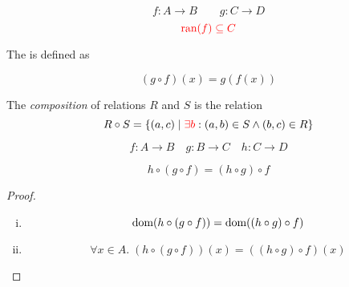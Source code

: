 
\begin{frame}{}
  \begin{center}
  \end{center}

\end{frame}

\begin{frame}{}
  \begin{definition}[Composition]
    \[
      f: A \to B \qquad g: C \to D
    \]
    \[
      \textcolor{red}{\text{ran}(f) \subseteq C}
    \]

    The   is defined as

    \[
      (g \circ f) (x) = g(f(x))
    \]
  \end{definition}

  \begin{center}
  \end{center}

  \pause
  \vspace{-0.30cm}
  \begin{definition}[Composition]
    The {\it composition} of relations $R$ and $S$ is the relation
    \[
      R \circ S = \{(a, c) \mid \textcolor{red}{\exists b}: (a, b) \in S \land (b, c) \in R\}
    \]
  \end{definition}
\end{frame}

\begin{frame}{}
  \begin{theorem}
    \[
      f: A \to B \quad g: B \to C \quad h: C \to D
    \]

    \[
      h \circ (g \circ f) = (h \circ g) \circ f
    \]
  \end{theorem}

  \pause
  \vspace{0.60cm}
  \begin{proof}
    \pause
    \begin{enumerate}[(i)]
      \item
        \[
          \text{dom}(h \circ (g \circ f)) = \text{dom}((h \circ g) \circ f)
        \]
      \item
        \[
          \forall x \in A.\; (h \circ (g \circ f))(x) = ((h \circ g) \circ f)(x)
        \]
    \end{enumerate}
  \end{proof}
\end{frame}

